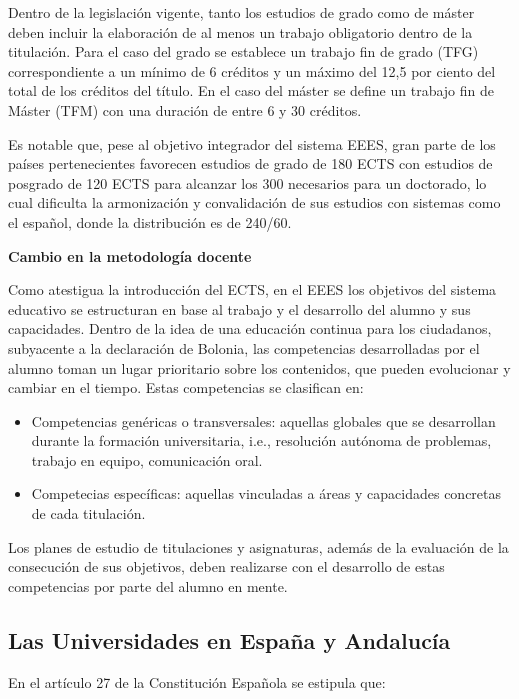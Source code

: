 \documentclass[a4paper,12pt,twoside]{article}
\begin{document}
Dentro de la legislación vigente, tanto los estudios de grado como de máster deben incluir la elaboración de al menos un trabajo obligatorio dentro de la titulación. Para el caso del grado se establece un trabajo fin de grado (TFG) correspondiente a un mínimo de
6 créditos y un máximo del 12,5 por ciento del total de los créditos del título. En el caso
del máster se define un trabajo fin de Máster (TFM) con una duración de entre 6
y 30 créditos.

Es notable que, pese al objetivo integrador del sistema EEES, gran parte de los países pertenecientes favorecen estudios de grado de 180 ECTS con estudios de posgrado de 120 ECTS para alcanzar los 300 necesarios para un doctorado, lo cual dificulta la armonización y convalidación de sus estudios con sistemas como el español, donde la distribución es de 240/60.

\textbf{Cambio en la metodología docente}

Como atestigua la introducción del ECTS, en el EEES los objetivos del sistema educativo se estructuran en base al trabajo y el desarrollo del alumno y sus capacidades. Dentro de la idea de una educación continua para los ciudadanos, subyacente a la declaración de Bolonia,  las competencias desarrolladas por el alumno toman un lugar prioritario sobre los contenidos, que pueden evolucionar y cambiar en el tiempo. Estas competencias se clasifican en:

\begin{itemize}
\item Competencias genéricas o transversales: aquellas globales que se desarrollan durante la formación universitaria, i.e., resolución autónoma de problemas, trabajo en equipo, comunicación oral.
\item Competecias específicas: aquellas vinculadas a áreas y capacidades
concretas de cada titulación.
\end{itemize} 

Los planes de estudio de titulaciones y asignaturas, además de la evaluación de la consecución de sus objetivos, deben realizarse con el desarrollo de estas competencias por parte del alumno en mente.

\subsection{Las Universidades en España y Andalucía}

En el artículo 27 de la Constitución Española se estipula que:
\end{document}
